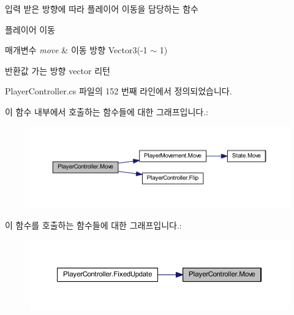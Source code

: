 입력 받은 방향에 따라 플레이어 이동을 담당하는 함수 

플레이어 이동 
\begin{DoxyParams}{매개변수}
{\em move} & 이동 방향 Vector3(-\/1 $\sim$ 1) \\
\hline
\end{DoxyParams}
\begin{DoxyReturn}{반환값}
가는 방향 vector 리턴 
\end{DoxyReturn}


Player\+Controller.\+cs 파일의 152 번째 라인에서 정의되었습니다.


\begin{DoxyCode}{0}

\end{DoxyCode}
이 함수 내부에서 호출하는 함수들에 대한 그래프입니다.\+:
\nopagebreak
\begin{figure}[H]
\begin{center}
\leavevmode
\includegraphics[width=350pt]{dc/dde/class_player_controller_a50157884365897164379b8bad7ee4722_cgraph}
\end{center}
\end{figure}
이 함수를 호출하는 함수들에 대한 그래프입니다.\+:
\nopagebreak
\begin{figure}[H]
\begin{center}
\leavevmode
\includegraphics[width=350pt]{dc/dde/class_player_controller_a50157884365897164379b8bad7ee4722_icgraph}
\end{center}
\end{figure}
